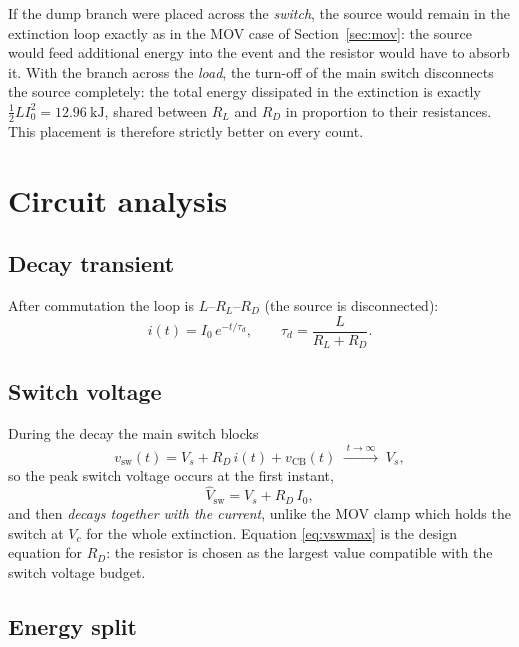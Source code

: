 \documentclass[11pt,a4paper]{article}
\begin{document}
If the dump branch were placed across the \emph{switch}, the source would
remain in the extinction loop exactly as in the MOV case of
Section~\ref{sec:mov}: the source would feed additional energy into the event
and the resistor would have to absorb it. With the branch across the
\emph{load}, the turn-off of the main switch disconnects the source
completely: the total energy dissipated in the extinction is exactly
$\tfrac{1}{2}LI_0^2 = \SI{12.96}{\kilo\joule}$, shared between $R_L$ and
$R_D$ in proportion to their resistances. This placement is therefore
strictly better on every count.

\section{Circuit analysis}
\label{sec:analysis}

\subsection{Decay transient}

After commutation the loop is $L$--$R_L$--$R_D$ (the source is disconnected):
\begin{equation}
i(t) = I_0\, e^{-t/\tau_d}, \qquad
\tau_d = \frac{L}{R_L + R_D}.
\label{eq:dumpdecay}
\end{equation}

\subsection{Switch voltage}

During the decay the main switch blocks
\begin{equation}
v_{\mathrm{sw}}(t) = V_s + R_D\, i(t) + v_{\mathrm{CB}}(t)
\;\xrightarrow{\;t\to\infty\;}\; V_s ,
\end{equation}
so the peak switch voltage occurs at the first instant,
\begin{equation}
\hat V_{\mathrm{sw}} = V_s + R_D\, I_0 ,
\label{eq:vswmax}
\end{equation}
and then \emph{decays together with the current}, unlike the MOV clamp which
holds the switch at $V_c$ for the whole extinction. Equation
\eqref{eq:vswmax} is the design equation for $R_D$: the resistor is chosen as
the largest value compatible with the switch voltage budget.

\subsection{Energy split}
\end{document}

